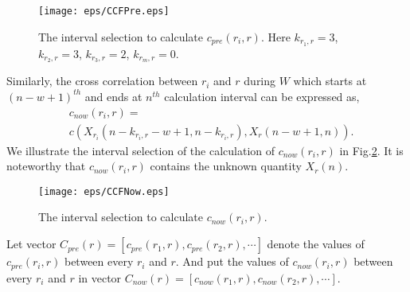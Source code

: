 \documentclass[twocolumn,10pt,final,conference]{IEEEtran}
\begin{document}
\begin{figure}[!h]
  \centering
\texttt{[image: eps/CCFPre.eps]}\\
  \caption{The interval selection to calculate $c_{pre}(r_i,r)$. Here $k_{r_1,r}=3$, $k_{r_2,r}=3$, $k_{r_3,r}=2$, $k_{r_m,r}=0$.}
  \label{fig-illustration of CCFPre}
\end{figure}
Similarly, the cross correlation between $r_i$ and $r$ during  $W$ which starts at $(n-w+1)^{th}$ and ends at $n^{th}$ calculation interval can be expressed as,
\begin{equation}\label{equ-cNow(ri,r)}
\begin{split}
& c_{now}(r_i,r)=\\
& c(X_{r_i}(n-k_{r_i,r}-w+1,n-k_{r_i,r}),X_r(n-w+1,n)).
\end{split}
\end{equation}
We illustrate the interval selection of the  calculation of $c_{now}(r_i,r) $ in Fig.\ref{fig-illustration of CCFNow}. It is noteworthy that $c_{now}(r_i,r)$ contains the unknown quantity $X_{r}(n)$.

\begin{figure}[!h]
  \centering
\texttt{[image: eps/CCFNow.eps]}\\
  \caption{The  interval selection to calculate $c_{now}(r_i,r)$.}
  \label{fig-illustration of CCFNow}

\end{figure}

Let vector $C_{pre}(r)=[c_{pre}(r_1,r),c_{pre}(r_2,r), \cdots]$ denote the values of $c_{pre}(r_i, r)$ between every $r_i$ and $r$.  And put the values of $c_{now}(r_i,r)$ between every $r_i$ and $r$ in vector $C_{now}(r)=[c_{now}(r_1,r),c_{now}(r_2,r),\cdots]$.
\end{document}
